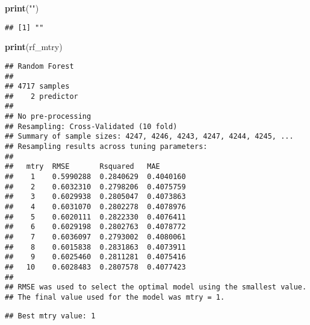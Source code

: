 \documentclass[
]{article}
\newenvironment{Shaded}{\begin{snugshade}}{\end{snugshade}}
\newcommand{\CharTok}[1]{\textcolor[rgb]{0.31,0.60,0.02}{#1}}
\newcommand{\KeywordTok}[1]{\textcolor[rgb]{0.13,0.29,0.53}{\textbf{#1}}}
\newcommand{\NormalTok}[1]{#1}
\newcommand{\OperatorTok}[1]{\textcolor[rgb]{0.81,0.36,0.00}{\textbf{#1}}}
\newcommand{\StringTok}[1]{\textcolor[rgb]{0.31,0.60,0.02}{#1}}
\begin{document}
\begin{Shaded}
\begin{Highlighting}[]
\KeywordTok{print}\NormalTok{(}\StringTok{""}\NormalTok{)}
\end{Highlighting}
\end{Shaded}

\begin{verbatim}
## [1] ""
\end{verbatim}

\begin{Shaded}
\begin{Highlighting}[]
\KeywordTok{print}\NormalTok{(rf_mtry)}
\end{Highlighting}
\end{Shaded}

\begin{verbatim}
## Random Forest 
## 
## 4717 samples
##    2 predictor
## 
## No pre-processing
## Resampling: Cross-Validated (10 fold) 
## Summary of sample sizes: 4247, 4246, 4243, 4247, 4244, 4245, ... 
## Resampling results across tuning parameters:
## 
##   mtry  RMSE       Rsquared   MAE      
##    1    0.5990288  0.2840629  0.4040160
##    2    0.6032310  0.2798206  0.4075759
##    3    0.6029938  0.2805047  0.4073863
##    4    0.6031070  0.2802278  0.4078976
##    5    0.6020111  0.2822330  0.4076411
##    6    0.6029198  0.2802763  0.4078772
##    7    0.6036097  0.2793002  0.4080061
##    8    0.6015838  0.2831863  0.4073911
##    9    0.6025460  0.2811281  0.4075416
##   10    0.6028483  0.2807578  0.4077423
## 
## RMSE was used to select the optimal model using the smallest value.
## The final value used for the model was mtry = 1.
\end{verbatim}

\begin{Shaded}
\end{Shaded}

\begin{verbatim}
## Best mtry value: 1
\end{verbatim}

\begin{Shaded}
\end{Shaded}
\end{document}
